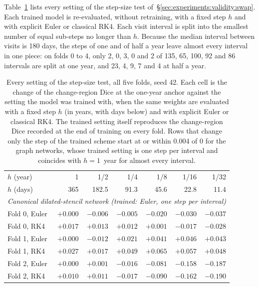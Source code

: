 Table~\ref{tab:appendix:step-ladder} lists every setting of the
step-size test of~\S\ref{sec:experiments:validity:swap}. Each trained
model is re-evaluated, without retraining, with a fixed step $h$ and with
explicit Euler or classical RK4. Each visit interval is split into the
smallest number of equal sub-steps no longer than $h$. Because the median
interval between visits is 180 days, the steps of one and of half a year
leave almost every interval in one piece: on folds 0 to 4, only 2, 0, 3,
0 and 2 of 135, 65, 100, 92 and 86 intervals are split at one year, and
23, 4, 9, 7 and 4 at half a year.

\begin{table}[!h]
  \centering
  \caption[Every setting of the step-size test.]{%
    Every setting of the step-size test, all five folds, seed 42.
    Each cell is the change of the change-region Dice at the one-year
    anchor against the setting the model was trained with, when the same
    weights are evaluated with a fixed step $h$ (in years, with days below)
    and with explicit Euler or classical RK4. The trained setting itself
    reproduces the change-region Dice recorded at the end of training on
    every fold. Rows that change only the step of the trained scheme start
    at or within 0.004 of 0 for the graph networks, whose trained setting
    is one step per interval and coincides with $h = 1$~year for almost
    every interval.}
  \label{tab:appendix:step-ladder}
  \footnotesize
  \setlength{\tabcolsep}{4pt}
  \begin{tabular}{l r r r r r r}
    \toprule
    $h$ (year) & 1 & 1/2 & 1/4 & 1/8 & 1/16 & 1/32 \\
    $h$ (days) & 365 & 182.5 & 91.3 & 45.6 & 22.8 & 11.4 \\
    \midrule
    \multicolumn{7}{l}{\emph{Canonical dilated-stencil network (trained: Euler, one step per interval)}} \\
    Fold 0, Euler & $+0.000$ & $-0.006$ & $-0.005$ & $-0.020$ & $-0.030$ & $-0.037$ \\
    Fold 0, RK4 & $+0.017$ & $+0.013$ & $+0.012$ & $+0.001$ & $-0.017$ & $-0.028$ \\
    Fold 1, Euler & $+0.000$ & $-0.012$ & $+0.021$ & $+0.041$ & $+0.046$ & $+0.043$ \\
    Fold 1, RK4 & $+0.027$ & $+0.017$ & $+0.049$ & $+0.065$ & $+0.057$ & $+0.048$ \\
    Fold 2, Euler & $+0.000$ & $+0.001$ & $-0.016$ & $-0.081$ & $-0.158$ & $-0.187$ \\
    Fold 2, RK4 & $+0.010$ & $+0.011$ & $-0.017$ & $-0.090$ & $-0.162$ & $-0.190$ \\

\end{tabular}
\end{table}
